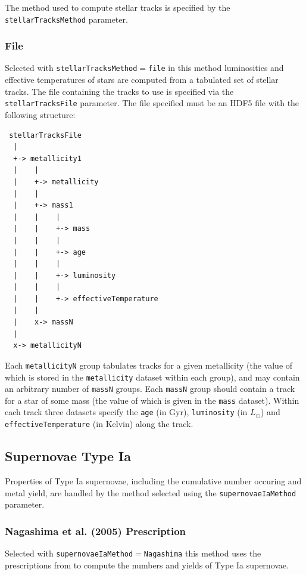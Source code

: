 The method used to compute stellar tracks is specified by the {\tt stellarTracksMethod} parameter.

\subsubsection{File}\label{sec:StellarTracksFile}

Selected with {\tt stellarTracksMethod}$=${\tt file} in this method luminosities and effective temperatures of stars are computed from a tabulated set of stellar tracks. The file containing the tracks to use is specified via the {\tt stellarTracksFile} parameter. The file specified must be an HDF5 file with the following structure:
\begin{verbatim}
 stellarTracksFile
  |
  +-> metallicity1
  |    |
  |    +-> metallicity
  |    |
  |    +-> mass1
  |    |    |
  |    |    +-> mass
  |    |    |
  |    |    +-> age
  |    |    |
  |    |    +-> luminosity
  |    |    |
  |    |    +-> effectiveTemperature
  |    |
  |    x-> massN
  |
  x-> metallicityN
\end{verbatim}
Each {\tt metallicityN} group tabulates tracks for a given metallicity (the value of which is stored in the {\tt metallicity} dataset within each group), and may contain an arbitrary number of {\tt massN} groups. Each {\tt massN} group should contain a track for a star of some mass (the value of which is given in the {\tt mass} dataset). Within each track three datasets specify the {\tt age} (in Gyr), {\tt luminosity} (in $L_\odot$) and {\tt effectiveTemperature} (in Kelvin) along the track.

\subsection{Supernovae Type Ia}

Properties of Type Ia supernovae, including the cumulative number occuring and metal yield, are handled by the method selected using the {\tt supernovaeIaMethod} parameter.

\subsubsection{Nagashima et al. (2005) Prescription}

Selected with {\tt supernovaeIaMethod}$=${\tt Nagashima} this method uses the prescriptions from \cite{nagashima_metal_2005} to compute the numbers and yields of Type Ia supernovae.

